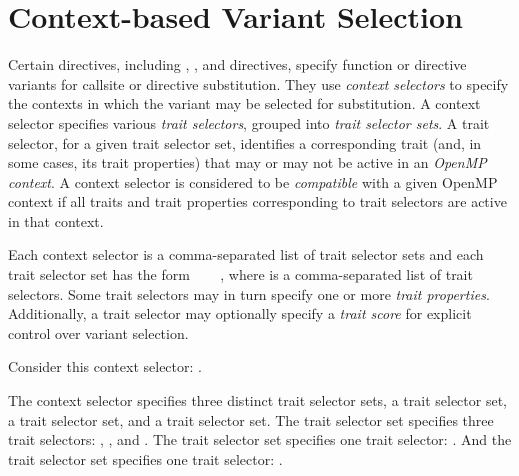 \section{Context-based Variant Selection}
\label{sec:context_based_variants}



Certain directives, including ,
, and 
directives, specify function or directive variants for callsite or directive
substitution. They use \emph{context selectors} to specify the contexts in which
the variant may be selected for substitution. A context selector specifies
various \emph{trait selectors}, grouped into \emph{trait selector sets}. A trait
selector, for a given trait selector set, identifies a corresponding trait
(and, in some cases, its trait properties) that may or may not be active in an
\emph{OpenMP context}. A context selector is considered to be \emph{compatible}
with a given OpenMP context if all traits and trait properties corresponding to
trait selectors are active in that context. 

Each context selector is a comma-separated list of trait selector sets and each
trait selector set has the form ~\kcode{=\{}~
~\kcode{\}}, where  is a
comma-separated list of trait selectors. Some trait selectors may in turn
specify one or more \emph{trait properties}. Additionally, a trait selector may
optionally specify a \emph{trait score} for explicit control over variant
selection.

Consider this context selector:  
 . 

The context selector specifies three distinct trait selector sets, a
 trait selector set, a  trait selector set, and
a  trait selector set. The  trait selector set
specifies three trait selectors: , , and
. The  trait selector set specifies one trait
selector: . And the  trait selector set
specifies one trait selector: . 

